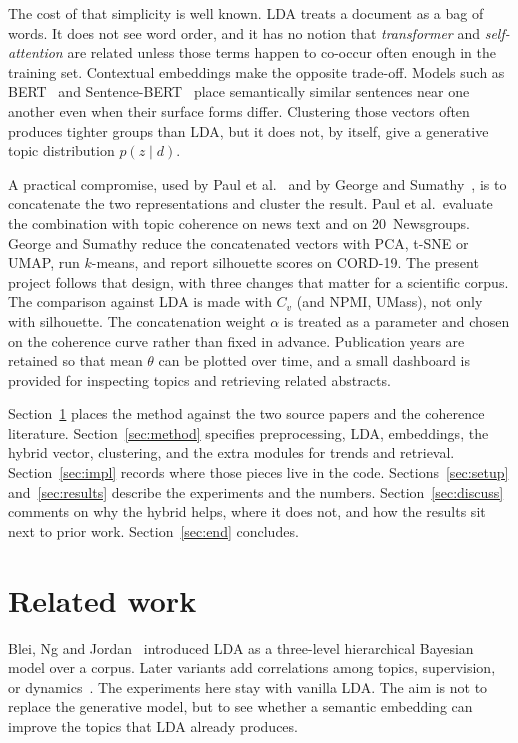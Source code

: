\documentclass[11pt,a4paper]{article}
\begin{document}
The cost of that simplicity is well known. LDA treats a document as a bag of words. It does not see word order, and it has no notion that \emph{transformer} and \emph{self-attention} are related unless those terms happen to co-occur often enough in the training set. Contextual embeddings make the opposite trade-off. Models such as BERT~\cite{devlin2019} and Sentence-BERT~\cite{reimers2019} place semantically similar sentences near one another even when their surface forms differ. Clustering those vectors often produces tighter groups than LDA, but it does not, by itself, give a generative topic distribution $p(z\mid d)$.

A practical compromise, used by Paul et al.~\cite{paul2025} and by George and Sumathy~\cite{george2023}, is to concatenate the two representations and cluster the result. Paul et al.\ evaluate the combination with topic coherence on news text and on 20~Newsgroups. George and Sumathy reduce the concatenated vectors with PCA, t-SNE or UMAP, run $k$-means, and report silhouette scores on CORD-19. The present project follows that design, with three changes that matter for a scientific corpus. The comparison against LDA is made with $C_v$ (and NPMI, UMass), not only with silhouette. The concatenation weight $\alpha$ is treated as a parameter and chosen on the coherence curve rather than fixed in advance. Publication years are retained so that mean $\theta$ can be plotted over time, and a small dashboard is provided for inspecting topics and retrieving related abstracts.

Section~\ref{sec:related} places the method against the two source papers and the coherence literature. Section~\ref{sec:method} specifies preprocessing, LDA, embeddings, the hybrid vector, clustering, and the extra modules for trends and retrieval. Section~\ref{sec:impl} records where those pieces live in the code. Sections~\ref{sec:setup} and~\ref{sec:results} describe the experiments and the numbers. Section~\ref{sec:discuss} comments on why the hybrid helps, where it does not, and how the results sit next to prior work. Section~\ref{sec:end} concludes.

\section{Related work}
\label{sec:related}

Blei, Ng and Jordan~\cite{blei2003} introduced LDA as a three-level hierarchical Bayesian model over a corpus. Later variants add correlations among topics, supervision, or dynamics~\cite{blei2006}. The experiments here stay with vanilla LDA. The aim is not to replace the generative model, but to see whether a semantic embedding can improve the topics that LDA already produces.
\end{document}

